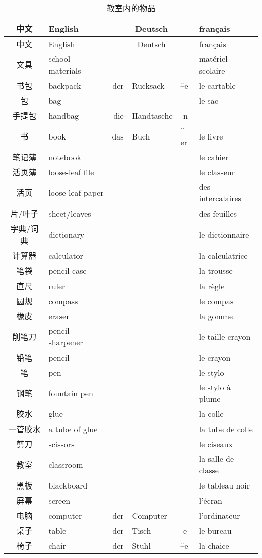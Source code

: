 \documentclass[12pt,A4paper,oneside,reqno]{amsart}
\numberwithin{equation}{section}
\theoremstyle{plain}
\theoremstyle{plain}
\theoremstyle{plain}
\numberwithin{equation}{section}
\theoremstyle{remark}
\begin{document}
	\begin{longtable}{c|l|rll|l}
			\hline
中文	&	English	 & \multicolumn{3}{c|}{Deutsch}&	français	\\		
		\hline
		\endhead
		\hline
中文	&	English	 & \multicolumn{3}{c|}{Deutsch}&	français	\\		
		\hline
		\endfirsthead	
		\hline
		\endfoot
		\hline		
	\caption{教室内的物品}
		\endlastfoot			

					
文具	&	school materials	&		&		&		&	mat\'{e}riel scolaire	\\
书包	&	backpack	&	der	&	Rucksack	&	\"{--}e	&	le cartable	\\
包	&	bag	&		&		&		&	le sac	\\
手提包	&	handbag	&	die	&	Handtasche	&	-n	&		\\
书	&	book	&	das	&	Buch	&	\"{--}er	&	le livre	\\
笔记簿	&	notebook	&		&		&		&	le cahier	\\
活页簿	&	loose-leaf file	&		&		&		&	le classeur	\\
活页	&	loose-leaf paper	&		&		&		&	des intercalaires	\\
片/叶子	&	sheet/leaves	&		&		&		&	des feuilles	\\
字典/词典	&	dictionary	&		&		&		&	le dictionnaire	\\
计算器	&	calculator	&		&		&		&	la calculatrice	\\
笔袋	&	pencil case	&		&		&		&	la trousse	\\
直尺	&	ruler	&		&		&		&	la règle	\\
圆规	&	compass	&		&		&		&	le compas	\\
橡皮	&	eraser	&		&		&		&	la gomme	\\
削笔刀	&	pencil sharpener	&		&		&		&	le taille-crayon	\\
铅笔	&	pencil	&		&		&		&	le crayon	\\
笔	&	pen	&		&		&		&	le stylo	\\
钢笔	&	fountain pen	&		&		&		&	le stylo \`{a} plume	\\
胶水	&	glue	&		&		&		&	la colle	\\
一管胶水	&	a tube of glue	&		&		&		&	la tube de colle 	\\
剪刀	&	scissors	&		&		&		&	le ciseaux	\\
\hline											
教室	&	classroom	&		&		&		&	la salle de classe	\\
黑板	&	blackboard	&		&		&		&	le tableau noir	\\
屏幕	&	screen	&		&		&		&	l'\'{e}cran	\\
电脑	&	computer	&	der 	&	Computer	&	-	&	l'ordinateur	\\
桌子	&	table	&	der	&	Tisch	&	-e	&	le bureau	\\
椅子	&	chair	&	der	&	Stuhl	&	\"{--}e	&	la chaice	\\


\hline		
\end{longtable}
\end{document}
